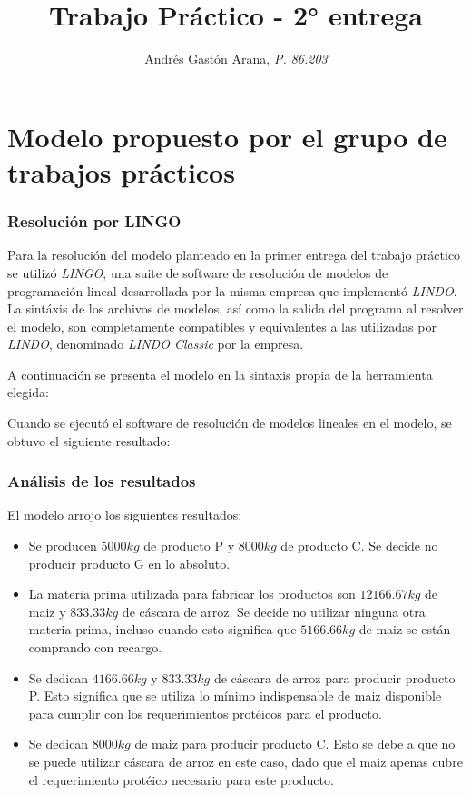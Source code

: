 \documentclass[a4paper,11pt]{article}
\title{\textbf{Trabajo Práctico} - 2° entrega}
\author{Andrés Gastón Arana, \textit{P. 86.203}}
\date{}
\begin{document}
\maketitle
\clearpage

\part{Modelo propuesto por el grupo de trabajos prácticos}

\section{Resolución por LINGO}

Para la resolución del modelo planteado en la primer entrega del trabajo
práctico se utilizó \textit{LINGO}, una suite de software de resolución de
modelos de programación lineal desarrollada por la misma empresa que implementó
\textit{LINDO}. La sintáxis de los archivos de modelos, así como la salida del
programa al resolver el modelo, son completamente compatibles y equivalentes a
las utilizadas por \textit{LINDO}, denominado \textit{LINDO Classic} por la
empresa.

A continuación se presenta el modelo en la sintaxis propia de la herramienta
elegida:



Cuando se ejecutó el software de resolución de modelos lineales en el modelo,
se obtuvo el siguiente resultado:



\section{Análisis de los resultados}

El modelo arrojo los siguientes resultados:

\begin{itemize}

\item Se producen \(5000kg\) de producto P y \(8000kg\) de producto C. Se
  decide no producir producto G en lo absoluto.

\item La materia prima utilizada para fabricar los productos son \(12166.67kg\)
  de maiz y \(833.33kg\) de cáscara de arroz. Se decide no utilizar ninguna
  otra materia prima, incluso cuando esto significa que \(5166.66kg\) de maiz
  se están comprando con recargo.

\item Se dedican \(4166.66kg\) y \(833.33kg\) de cáscara de arroz para producir
  producto P. Esto significa que se utiliza lo mínimo indispensable de maiz
  disponible para cumplir con los requerimientos protéicos para el producto.

\item Se dedican \(8000kg\) de maiz para producir producto C. Esto se debe a
  que no se puede utilizar cáscara de arroz en este caso, dado que el maiz
  apenas cubre el requerimiento protéico necesario para este producto.

\end{itemize}
\end{document}
